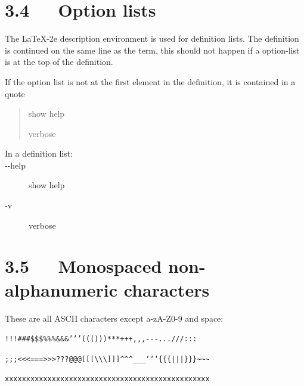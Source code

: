 \documentclass[a4paper]{memoir}
\providecommand*{\DUoptionlistlabel}[1]{\bfseries #1 \hfill}
\newenvironment{DUoptionlist}{%
    \list{}{\setlength{\labelwidth}{\DUoptionlistindent}
            \setlength{\rightmargin}{1cm}
            \setlength{\leftmargin}{\rightmargin}
            \addtolength{\leftmargin}{\labelwidth}
            \addtolength{\leftmargin}{\labelsep}
            \renewcommand{\makelabel}{\DUoptionlistlabel}}
  }
  {\endlist}
\begin{document}


\section{3.4   Option lists%
  \label{option-lists-1}%
}

The LaTeX-2e description environment is used for definition lists.
The definition is continued on the same line as the term, this should
not happen if a option-list is at the top of the definition.

If the option list is not at the first element in the definition, it
is contained in a quote

\begin{quote}
\begin{DUoptionlist}
\item[-{}-help]  show help

\item[-v]  verbose
\end{DUoptionlist}
\end{quote}

\begin{description}
\item[{In a definition list:}] \leavevmode 
\begin{DUoptionlist}
\item[-{}-help]  show help

\item[-v]  verbose
\end{DUoptionlist}

\end{description}


\section{3.5   Monospaced non-alphanumeric characters%
  \label{monospaced-non-alphanumeric-characters}%
}

These are all ASCII characters except a-zA-Z0-9 and space:

\texttt{!!!\textquotedbl{}\textquotedbl{}\textquotedbl{}\#\#\#\$\$\$\%\%\%\&\&\&'{}'{}'((()))***+++,{},{},-{}-{}-...///:::}

\texttt{;;;<{}<{}<===>{}>{}>???@@@{[}{[}{[}\textbackslash{}\textbackslash{}\textbackslash{}{]}{]}{]}\textasciicircum{}\textasciicircum{}\textasciicircum{}\_\_\_`{}`{}`\{\{\{|||\}\}\}\textasciitilde{}\textasciitilde{}\textasciitilde{}}

\texttt{xxxxxxxxxxxxxxxxxxxxxxxxxxxxxxxxxxxxxxxxxxxxxxxx}
\end{document}
